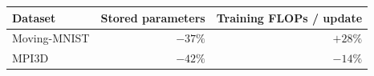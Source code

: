 \begin{tabular}{@{}lrr@{}}
\toprule
Dataset & Stored parameters & Training FLOPs / update \\
\midrule
Moving-MNIST & $-37\%$ & $+28\%$ \\
MPI3D & $-42\%$ & $-14\%$ \\
\bottomrule
\end{tabular}
